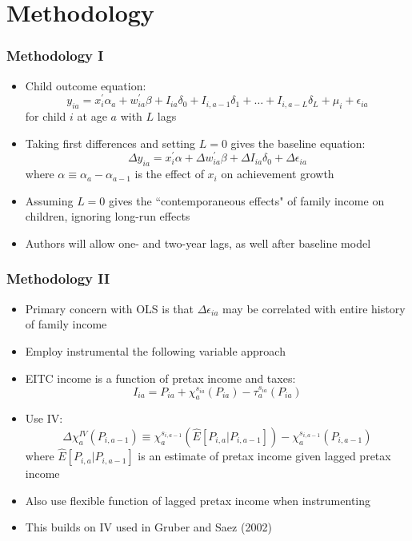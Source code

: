 \documentclass{beamer}
\begin{document}
\section{Methodology}


\begin{frame}
\frametitle{Methodology I}
\begin{itemize}
	\item Child outcome equation:
	\begin{equation}
		y_{ia} = x_i^' \alpha_a + w_{ia}^' \beta + I_{ia}\delta_0 + I_{i, a-1}\delta_1 + \dots + I_{i, a-L}\delta_L + \mu_i + \epsilon_{ia} 
	\end{equation}
	for child $i$ at age $a$ with $L$ lags %
	\item Taking first differences and setting $L=0$ gives the baseline equation:
	\begin{equation}
		\Delta y_{ia} = x_i^' \alpha + \Delta w_{ia}^' \beta + \Delta I_{ia}\delta_0 + \Delta \epsilon_{ia}
	\end{equation}
	where $ \alpha \equiv \alpha_a - \alpha_{a-1} $ is the effect of $x_i$ on achievement growth
	\item Assuming $L=0$ gives the ``contemporaneous effects" of family income on children, ignoring long-run effects
	\item Authors will allow one- and two-year lags, as well after baseline model
\end{itemize}
\end{frame}

\begin{frame}
\frametitle{Methodology II}
\begin{itemize}
	\item Primary concern with OLS is that $\Delta \epsilon_{ia}$ may be correlated with entire history of family income
	\item Employ instrumental the following variable approach
	\item EITC income is a function of pretax income and taxes:
	\begin{equation*}
		I_{ia} = P_{ia} + \chi_a^{s_{ia}}(P_{ia}) - \tau_a^{s_{ia}}(P_{ia})
	\end{equation*}
	\item Use IV:  
	\begin{equation*}
		\Delta \chi_a^{IV}(P_{i, a-1}) \equiv \chi_a^{s_{i, a-1}}(\hat{E}\left[P_{i,a} | P_{i, a-1} \right]) -  \chi_a^{s_{i, a-1}}(P_{i,a-1})
	\end{equation*}
	where $ \hat{E}\left[P_{i,a} | P_{i, a-1} \right] $ is an estimate of pretax income given lagged pretax income
	\item Also use flexible function of lagged pretax income when instrumenting
	\item This builds on IV used in Gruber and Saez (2002)
\end{itemize}
\end{frame}
\end{document}
